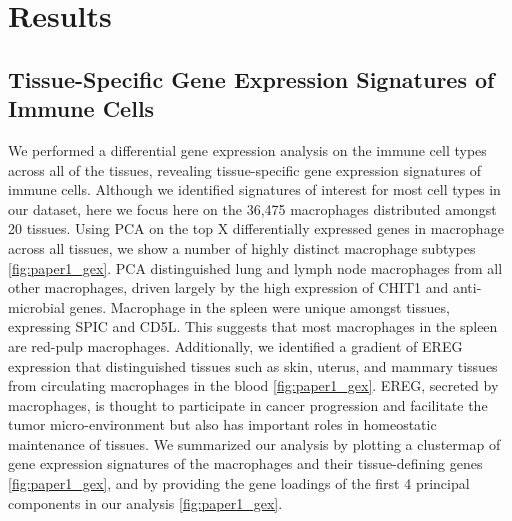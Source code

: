\section{Results}

\subsection{Tissue-Specific Gene Expression Signatures of Immune Cells}

We performed a differential gene expression analysis on the immune cell types across all of the tissues, revealing tissue-specific gene expression signatures of immune cells. Although we identified signatures of interest for most cell types in our dataset, here we focus here on the 36,475 macrophages distributed amongst 20 tissues. Using PCA on the top X differentially expressed genes in macrophage across all tissues, we show a number of highly distinct macrophage subtypes \ref{fig:paper1_gex}. PCA distinguished lung and lymph node macrophages from all other macrophages, driven largely by the high expression of CHIT1 and anti-microbial genes. Macrophage in the spleen were unique amongst tissues, expressing SPIC and CD5L. This suggests that most macrophages in the spleen are red-pulp macrophages. Additionally, we identified a gradient of EREG expression that distinguished tissues such as skin, uterus, and mammary tissues from circulating macrophages in the blood \ref{fig:paper1_gex}. EREG, secreted by macrophages, is thought to participate in cancer progression and facilitate the tumor micro-environment but also has important roles in homeostatic maintenance of tissues. We summarized our analysis by plotting a clustermap of gene expression signatures of the macrophages and their tissue-defining genes \ref{fig:paper1_gex}, and by providing the gene loadings of the first 4 principal components in our analysis \ref{fig:paper1_gex}.  
